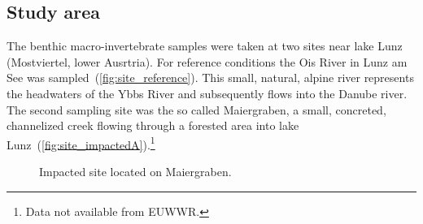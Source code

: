 








\subsection{Study area}\label{sec:study_area}                %


The benthic macro-invertebrate samples were taken at two sites near lake Lunz (Mostviertel, lower Ausrtria). For reference conditions the Ois River in Lunz am See was sampled~(\cref{fig:site_reference}). This small, natural, alpine river represents the headwaters of the Ybbs River and subsequently flows into the Danube river. The second sampling site was the so called Maiergraben, a small, concreted, channelized creek flowing through a forested area into lake Lunz~(\cref{fig:site_impactedA}).\footnote{Data not available from EUWWR.}



\begin{figure}[!htb]                                                        %
\centering                                                                  %
  \hfill                                                                                    %
  \hspace*{\fill}                                                                           %
\caption{Impacted site located on Maiergraben.}\label{fig:site_impacted}          %
\end{figure}




